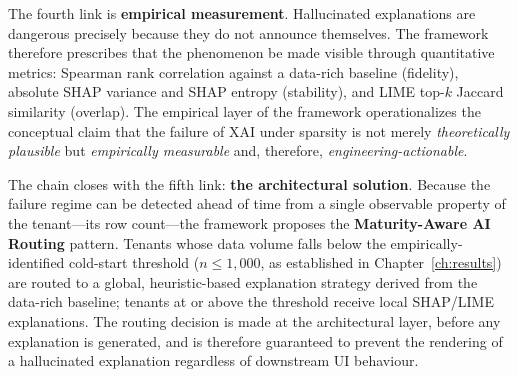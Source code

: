 The fourth link is \textbf{empirical measurement}. Hallucinated explanations
are dangerous precisely because they do not announce themselves. The
framework therefore prescribes that the phenomenon be made visible through
quantitative metrics: Spearman rank correlation against a data-rich baseline
(fidelity), absolute SHAP variance and SHAP entropy (stability), and LIME
top-$k$ Jaccard similarity (overlap). The empirical layer of the framework
operationalizes the conceptual claim that the failure of XAI under sparsity
is not merely \emph{theoretically plausible} but \emph{empirically
measurable} and, therefore, \emph{engineering-actionable}.

The chain closes with the fifth link: \textbf{the architectural solution}.
Because the failure regime can be detected ahead of time from a single
observable property of the tenant---its row count---the framework proposes
the \textbf{Maturity-Aware AI Routing} pattern. Tenants whose data volume
falls below the empirically-identified cold-start threshold ($n \le 1{,}000$,
as established in Chapter~\ref{ch:results}) are routed to a global,
heuristic-based explanation strategy derived from the data-rich baseline;
tenants at or above the threshold receive local SHAP/LIME explanations. The
routing decision is made at the architectural layer, before any explanation
is generated, and is therefore guaranteed to prevent the rendering of a
hallucinated explanation regardless of downstream UI behaviour.

